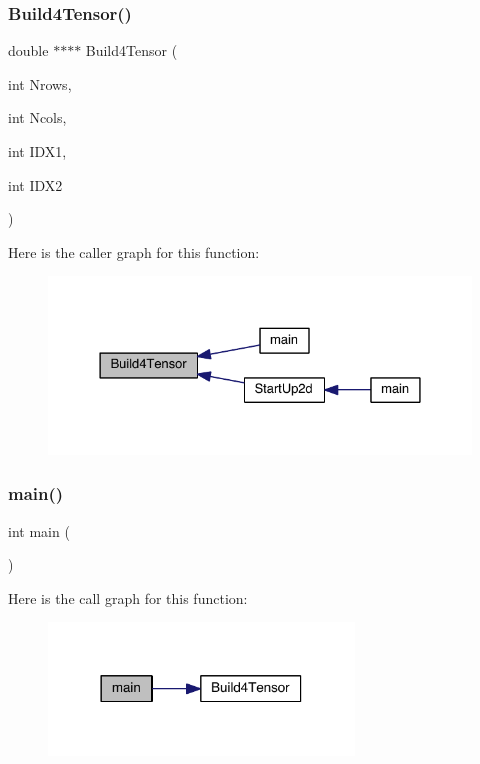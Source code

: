 \subsubsection{\texorpdfstring{Build4\+Tensor()}{Build4Tensor()}}
{\footnotesize\ttfamily double $\ast$$\ast$$\ast$$\ast$ Build4\+Tensor (\begin{DoxyParamCaption}\item[{int}]{Nrows,  }\item[{int}]{Ncols,  }\item[{int}]{I\+D\+X1,  }\item[{int}]{I\+D\+X2 }\end{DoxyParamCaption})}

Here is the caller graph for this function\+:\nopagebreak
\begin{figure}[H]
\begin{center}
\leavevmode
\includegraphics[width=328pt]{a00440_aff625505c4d622f25ca1ff559149e2a5_icgraph}
\end{center}
\end{figure}
\mbox{\label{a00440_ae66f6b31b5ad750f1fe042a706a4e3d4}} 
\subsubsection{\texorpdfstring{main()}{main()}}
{\footnotesize\ttfamily int main (\begin{DoxyParamCaption}{ }\end{DoxyParamCaption})}

Here is the call graph for this function\+:\nopagebreak
\begin{figure}[H]
\begin{center}
\leavevmode
\includegraphics[width=230pt]{a00440_ae66f6b31b5ad750f1fe042a706a4e3d4_cgraph}
\end{center}
\end{figure}
